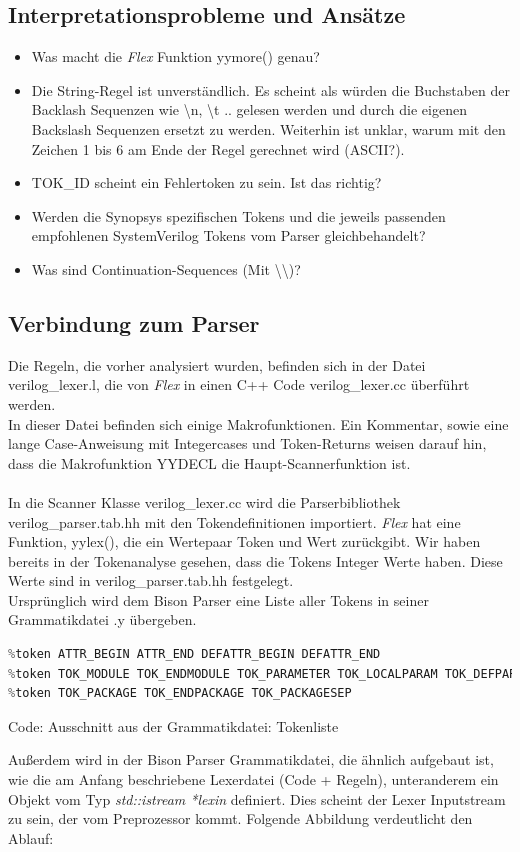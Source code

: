 \documentclass[11pt]{report}
\begin{document}
\subsection{Interpretationsprobleme und Ansätze}
\begin{itemize}

\item Was macht die \textit{Flex} Funktion yymore() genau?
\item Die String-Regel ist unverständlich. Es scheint als würden die Buchstaben der Backlash Sequenzen wie \textbackslash n, \textbackslash t .. gelesen werden und durch die eigenen Backslash Sequenzen ersetzt zu werden. Weiterhin ist unklar, warum mit den Zeichen 1 bis 6 am Ende der Regel gerechnet wird (ASCII?).
\item TOK\_ID scheint ein Fehlertoken zu sein. Ist das richtig?
\item Werden die Synopsys spezifischen Tokens und die jeweils passenden empfohlenen SystemVerilog Tokens vom Parser gleichbehandelt?
\item Was sind Continuation-Sequences (Mit \textbackslash \textbackslash)?
\end{itemize}

\subsection{Verbindung zum Parser}
Die Regeln, die vorher analysiert wurden, befinden sich in der Datei verilog\_lexer.l, die von \textit{Flex} in einen C++ Code verilog\_lexer.cc überführt werden. \\
In dieser Datei befinden sich einige Makrofunktionen. Ein Kommentar, sowie eine lange Case-Anweisung mit Integercases und Token-Returns weisen darauf hin, dass die Makrofunktion YYDECL die Haupt-Scannerfunktion ist. 
\\
\\
In die Scanner Klasse verilog\_lexer.cc wird die Parserbibliothek verilog\_parser.tab.hh mit den Tokendefinitionen importiert.
\textit{Flex} hat eine Funktion, yylex(), die ein Wertepaar Token und Wert zurückgibt. Wir haben bereits in der Tokenanalyse gesehen, dass die Tokens Integer Werte haben. Diese Werte sind in verilog\_parser.tab.hh festgelegt.\\
Ursprünglich wird dem Bison Parser eine Liste aller Tokens in seiner Grammatikdatei .y übergeben.
\begin{lstlisting}[language=C++]
%token TOK_ASSERT TOK_ASSUME TOK_RESTRICT TOK_COVER TOK_FINAL
%token ATTR_BEGIN ATTR_END DEFATTR_BEGIN DEFATTR_END
%token TOK_MODULE TOK_ENDMODULE TOK_PARAMETER TOK_LOCALPARAM TOK_DEFPARAM
%token TOK_PACKAGE TOK_ENDPACKAGE TOK_PACKAGESEP
\end{lstlisting}
\begin{description}
  \item[Code: Ausschnitt aus der Grammatikdatei: Tokenliste]
\end{description}
Außerdem wird in der Bison Parser Grammatikdatei, die ähnlich aufgebaut ist, wie die am Anfang beschriebene Lexerdatei (Code + Regeln), unteranderem ein Objekt vom Typ \textit{std::istream *lexin} definiert. Dies scheint der Lexer Inputstream zu sein, der vom Preprozessor kommt. Folgende Abbildung verdeutlicht den Ablauf:
\end{document}
